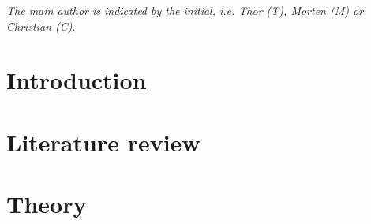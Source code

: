 























%








\maketitle

\thispagestyle{empty}

\clearpage

\pagestyle{scrheadings}\noindent
\textit{The main author is indicated by the initial, i.e. Thor (T), Morten (M) or Christian (C)}.
\small {
\tableofcontents
\clearpage
}
\clearpage
\normalsize

\section{Introduction}


\section{Literature review}


\section{Theory}


